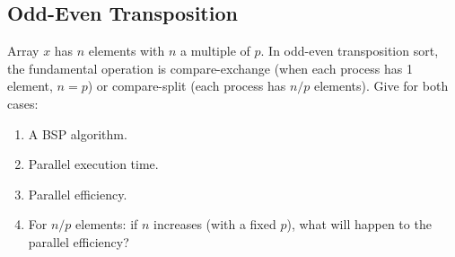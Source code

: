 \documentclass[../main.tex]{subfiles}
\begin{document}
\subsection{Odd-Even Transposition}
\begin{question}
Array $x$ has $n$ elements with $n$ a multiple of $p$. In odd-even transposition sort, the fundamental operation is compare-exchange (when each process has 1 element, $n = p$) or compare-split (each process has $n/p$ elements). Give for both cases:
\begin{enumerate}
	\item A BSP algorithm.
	\item Parallel execution time.
	\item Parallel efficiency.
	\item For $n/p$ elements: if $n$ increases (with a fixed $p$), what will happen to the parallel efficiency?
\end{enumerate}

\end{question}
\end{document}
